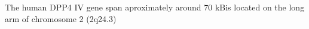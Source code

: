 The human DPP4 IV gene span aproximately around 70 kBis located on the long arm of chromosome 2 (2q24.3)